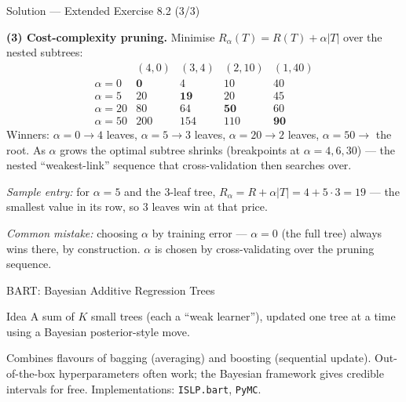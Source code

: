\documentclass[aspectratio=169,11pt]{beamer}
\begin{document}
\begin{frame}{Solution --- Extended Exercise 8.2 (3/3)}
\begin{solutionbox}
\textbf{(3) Cost-complexity pruning.} Minimise $R_\alpha(T)=R(T)+\alpha|T|$ over the nested subtrees:
\[
\begin{array}{c|cccc}
 & (4,0) & (3,4) & (2,10) & (1,40)\\\hline
\alpha{=}0 & \mathbf{0} & 4 & 10 & 40\\
\alpha{=}5 & 20 & \mathbf{19} & 20 & 45\\
\alpha{=}20 & 80 & 64 & \mathbf{50} & 60\\
\alpha{=}50 & 200 & 154 & 110 & \mathbf{90}
\end{array}
\]
Winners: $\alpha{=}0\!\to\!4$ leaves, $\alpha{=}5\!\to\!3$ leaves, $\alpha{=}20\!\to\!2$ leaves, $\alpha{=}50\!\to\!$ the root. As $\alpha$ grows the optimal subtree shrinks (breakpoints at $\alpha=4,6,30$) --- the nested ``weakest-link'' sequence that cross-validation then searches over.

\medskip
\emph{Sample entry:} for $\alpha=5$ and the $3$-leaf tree, $R_\alpha=R+\alpha|T|=4+5\cdot3=19$ --- the smallest value in its row, so $3$ leaves win at that price.

\smallskip
\textit{Common mistake:} choosing $\alpha$ by training error --- $\alpha=0$ (the full tree) always wins there, by construction. $\alpha$ is chosen by cross-validating over the pruning sequence.
\end{solutionbox}
\end{frame}

\begin{frame}{BART: Bayesian Additive Regression Trees}
  \begin{block}{Idea}
    A sum of $K$ small trees (each a ``weak learner''), updated one
    tree at a time using a Bayesian posterior-style move.
  \end{block}
  \begin{takeaway}
    Combines flavours of bagging (averaging) and boosting (sequential
    update). Out-of-the-box hyperparameters often work; the Bayesian
    framework gives credible intervals for free. Implementations:
    \texttt{ISLP.bart}, \texttt{PyMC}.
  \end{takeaway}
\end{frame}
\end{document}
